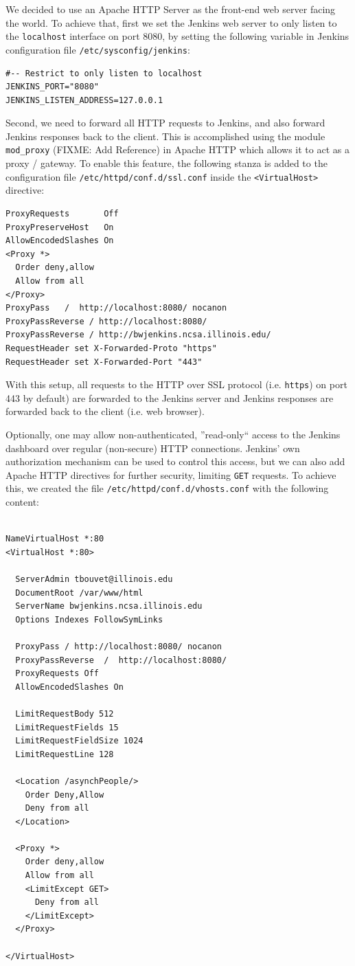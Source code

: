 \documentclass[10pt, conference, compsocconf]{IEEEtran}
\begin{document}
We decided to use an Apache HTTP Server as the front-end web server facing the world. 
To achieve that, first we set the Jenkins web server to only listen to the \texttt{localhost} interface on port 8080, by setting the following variable in Jenkins configuration file \texttt{/etc/sysconfig/jenkins}:
\begin{lstlisting}
#-- Restrict to only listen to localhost
JENKINS_PORT="8080"
JENKINS_LISTEN_ADDRESS=127.0.0.1
\end{lstlisting}

Second, we need to forward all HTTP requests to Jenkins, and also forward Jenkins responses back to the client. 
This is accomplished using the module \texttt{mod_proxy} (FIXME: Add Reference) in Apache HTTP which allows it to act as a proxy / gateway. 
To enable this feature, the following stanza is added to the configuration file \texttt{/etc/httpd/conf.d/ssl.conf} inside the \texttt{<VirtualHost>} directive:

\begin{lstlisting}
ProxyRequests       Off
ProxyPreserveHost   On 
AllowEncodedSlashes On 
<Proxy *>
  Order deny,allow
  Allow from all  
</Proxy>
ProxyPass   /  http://localhost:8080/ nocanon
ProxyPassReverse / http://localhost:8080/
ProxyPassReverse / http://bwjenkins.ncsa.illinois.edu/
RequestHeader set X-Forwarded-Proto "https"
RequestHeader set X-Forwarded-Port "443"    
\end{lstlisting}

With this setup, all requests to the HTTP over SSL protocol (i.e. \texttt{https}) on port 443 by default) are forwarded to the Jenkins server and Jenkins responses are forwarded back to the client (i.e. web browser).

Optionally, one may allow non-authenticated, ''read-only`` access to the Jenkins dashboard over regular (non-secure) HTTP connections. 
Jenkins' own authorization mechanism can be used to control this access, but we can also add Apache HTTP directives for further security, limiting \texttt{GET} requests. 
To achieve this, we created the file \texttt{/etc/httpd/conf.d/vhosts.conf} with the following content:
\begin{lstlisting}
 
NameVirtualHost *:80
<VirtualHost *:80>

  ServerAdmin tbouvet@illinois.edu
  DocumentRoot /var/www/html
  ServerName bwjenkins.ncsa.illinois.edu
  Options Indexes FollowSymLinks

  ProxyPass / http://localhost:8080/ nocanon
  ProxyPassReverse  /  http://localhost:8080/
  ProxyRequests Off
  AllowEncodedSlashes On

  LimitRequestBody 512
  LimitRequestFields 15
  LimitRequestFieldSize 1024
  LimitRequestLine 128

  <Location /asynchPeople/>
    Order Deny,Allow
    Deny from all
  </Location>

  <Proxy *>
    Order deny,allow
    Allow from all
    <LimitExcept GET>
      Deny from all
    </LimitExcept>
  </Proxy>

</VirtualHost>

\end{lstlisting}
\end{document}
